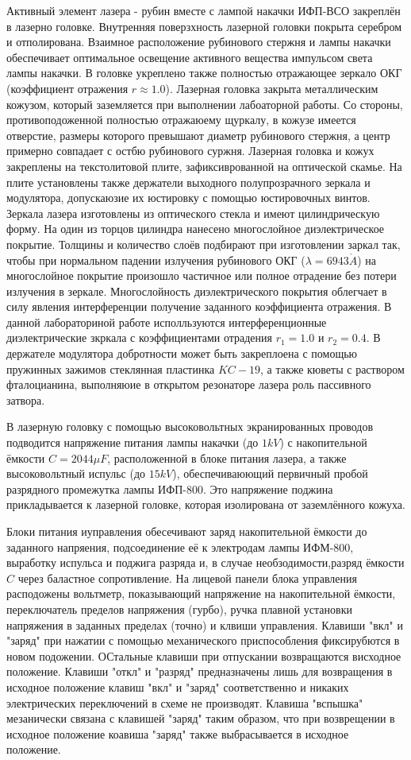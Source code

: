 \documentclass[a4paper,14pt,russian]{article}
\renewcommand{\AA}{\ensuremath{\mathring{A}}}
\begin{document}
Активный элемент лазера - рубин вместе с лампой накачки ИФП-ВСО закреплён в лазерно головке. Внутренняя поверзхность лазерной головки покрыта серебром и отполирована. Взаимное расположение рубинового стержня и лампы накачки обеспечивает оптимальное освещение активного вещества импульсом света лампы накачки. В головке укреплено также полностью отражающее зеркало ОКГ (коэффициент отражения $r \approx 1.0$). Лазерная головка закрыта металлическим кожузом, который заземляется при выполнении лабоаторной работы. Со стороны, противоподоженной полностью отражаюему щуркалу, в кожузе имеется отверстие, размеры которого превышают диаметр рубинового стержня, а центр примерно совпадает с остбю рубинового суржня. Лазерная головка и кожух закреплены на текстолитовой плите, зафиксиврованной на оптической скамье. На плите установлены также держатели выходного полупрозрачного зеркала и модулятора, допускаюзие их юстировку с помощью юстировочных винтов. Зеркала лазера изготовлены из оптического стекла и имеют цилиндрическую форму. На один из торцов цилиндра нанесено многослойное диэлектрическое покрытие. Толщины и количество слоёв подбирают при изготовлении заркал так, чтобы при нормальном падении излучения рубинового ОКГ ($\lambda = 6943 \AA$) на многослойное покрытие произошло частичное или полное отрадение без потери излучения в зеркале. Многослойность диэлектрического покрытия облегчает в силу явления интерференции получение заданного коэффициента отражения. В данной лабораториной работе исполльзуются интерференционные диэлектрические зкркала с коэффициентами отрадения $r_1 = 1.0$ и $r_2 = 0.4$. В держателе модулятора добротности может быть закреплоена с помощью пружинных зажимов стеклянная пластинка $KC-19$, а также кюветы с раствором фталоцианина, выполняюие в открытом резонаторе лазера роль пассивного затвора.

В лазерную головку с помощью высоковольтных экранированных проводов подводится напряжение питания лампы накачки (до $1 kV$) с накопительной ёмкости $C = 2044 \mu F$, расположенной в блоке питания лазера, а также высоковольтный испульс (до $15 kV$), обеспечиваюющий первичный пробой разрядного промежутка лампы ИФП-800. Это напряжение поджина прикладывается к лазерной головке, которая изолирована от заземлённого кожуха.

Блоки питания иуправления обесечивают заряд накопительной ёмкости до заданного напряения, подсоединение её к электродам лампы ИФМ-800, выработку испульса и поджига разряда и, в случае необзодимости,разряд ёмкости $C$ через баластное сопротивление. На лицевой панели блока управления расподожены вольтметр, показывающий напряжение на накопительной ёмкости, переключатель пределов напряжения (гурбо), ручка плавной установки напряжения в заданных пределах (точно) и клвиши управления. Клавиши "вкл" и "заряд" при нажатии с помощью механического приспособления фиксирубются в новом подожении. ОСтальные клавиши при отпускании возвращаются висходное положение. Клавиши "откл" и "разряд" предназначены лишь для возвращения в исходное положение клавиш "вкл" и "заряд" соответственно и никаких электрических переключений в схеме не производят. Клавиша "вспышка" мезанически связана с клавишей "заряд" таким образом, что при возврещении в исходное положение коавиша "заряд" также выбрасывается в исходное положение.
\end{document}
